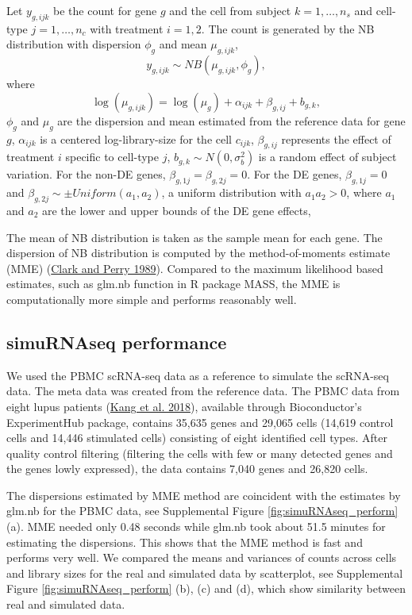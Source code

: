 \documentclass[
]{article}
\begin{document}
Let \(y_{g, ijk}\) be the count for gene \(g\) and the cell from subject
\(k = 1,\ldots, n_s\) and cell-type \(j = 1, \ldots, n_c\) with
treatment \(i=1,2\). The count is generated by the NB distribution with
dispersion \(\phi_g\) and mean \(\mu_{g,ijk}\),
\begin{equation}\label{nbinomsimu}
y_{g, ijk}\sim NB(\mu_{g,ijk}, \phi_g),
\end{equation} where
\[\log(\mu_{g,ijk}) = \log(\mu_g) + \alpha_{ijk} + \beta_{g, ij} + b_{g,k},\]
\(\phi_g\) and \(\mu_g\) are the dispersion and mean estimated from the
reference data for gene \(g\), \(\alpha_{ijk}\) is a centered
log-library-size for the cell \(c_{ijk}\), \(\beta_{g,ij}\) represents
the effect of treatment \(i\) specific to cell-type \(j\),
\(b_{g,k} \sim N(0, \sigma^2_b)\) is a random effect of subject
variation. For the non-DE genes, \(\beta_{g,1j}=\beta_{g,2j}=0\). For
the DE genes, \(\beta_{g,1j} = 0\) and
\(\beta_{g, 2j}\sim \pm Uniform(a_1, a_2)\), a uniform distribution with
\(a_1a_2>0\), where \(a_1\) and \(a_2\) are the lower and upper bounds
of the DE gene effects,

The mean of NB distribution is taken as the sample mean for each gene.
The dispersion of NB distribution is computed by the method-of-moments
estimate (MME) (\protect\hyperlink{ref-Clark1989}{Clark and Perry
1989}). Compared to the maximum likelihood based estimates, such as
glm.nb function in R package MASS, the MME is computationally more
simple and performs reasonably well.

\hypertarget{simurnaseq-performance}{%
\subsection{simuRNAseq performance}\label{simurnaseq-performance}}

We used the PBMC scRNA-seq data as a reference to simulate the scRNA-seq
data. The meta data was created from the reference data. The PBMC data
from eight lupus patients (\protect\hyperlink{ref-PBMC2018}{Kang et al.
2018}), available through Bioconductor's ExperimentHub package, contains
35,635 genes and 29,065 cells (14,619 control cells and 14,446
stimulated cells) consisting of eight identified cell types. After
quality control filtering (filtering the cells with few or many detected
genes and the genes lowly expressed), the data contains 7,040 genes and
26,820 cells.

The dispersions estimated by MME method are coincident with the
estimates by glm.nb for the PBMC data, see Supplemental Figure
\ref{fig:simuRNAseq_perform} (a). MME needed only 0.48 seconds while
glm.nb took about 51.5 minutes for estimating the dispersions. This
shows that the MME method is fast and performs very well. We compared
the means and variances of counts across cells and library sizes for the
real and simulated data by scatterplot, see Supplemental Figure
\ref{fig:simuRNAseq_perform} (b), (c) and (d), which show similarity
between real and simulated data.
\end{document}
